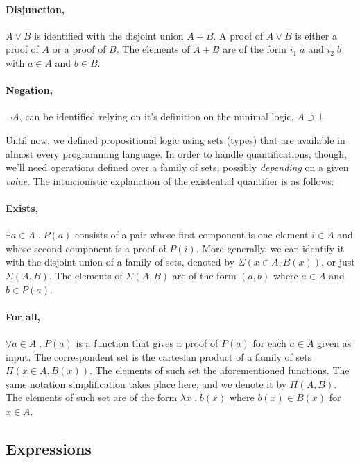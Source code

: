 \newcommand{\ione}{i_1}
\newcommand{\itwo}{i_2}
\paragraph{Disjunction,} $A \vee B$ is identified with the disjoint union $A + B$. A proof
of $A \vee B$ is either a proof of $A$ or a proof of $B$. The elements of $A + B$ are of the
form $\ione\; a$ and $\itwo\; b$ with $a \in A$ and $b \in B$.

\paragraph{Negation,} $\neg A$, can be identified relying on it's definition
on the minimal logic, $A \supset \bot$

Until now, we defined propositional logic using sets (types) that are available in almost every
programming language. In order to handle quantifications, though, we'll need operations defined over a 
family of sets, possibly \emph{depending} on a given \emph{value}. The intuicionistic explanation
of the existential quantifier is as follows:

\paragraph{Exists,} $\exists a \in A \; . \; P(a)$ consists of a pair whose first
component is one element $i \in A$ and whose second component is a proof of $P(i)$. More generally,
we can identify it with the disjoint union of a family of sets, denoted by $\Sigma(x \in A, B(x))$,
or just $\Sigma(A, B)$. The elements of $\Sigma(A, B)$ are of the form $(a, b)$ where $a \in A$ and
$b \in P(a)$.

\paragraph{For all,} $\forall a \in A \; . \; P(a)$ is a function that gives a proof of $P(a)$
for each $a \in A$ given as input. The correspondent set is the cartesian product of a family
of sets $\Pi(x \in A, B(x))$. The elements of such set the aforementioned functions. The same
notation simplification takes place here, and we denote it by $\Pi(A, B)$. The elements of such set
are of the form $\lambda x\;.\;b(x)$ where $b(x) \in B(x)$ for $x \in A$. 

\subsection{Expressions}


